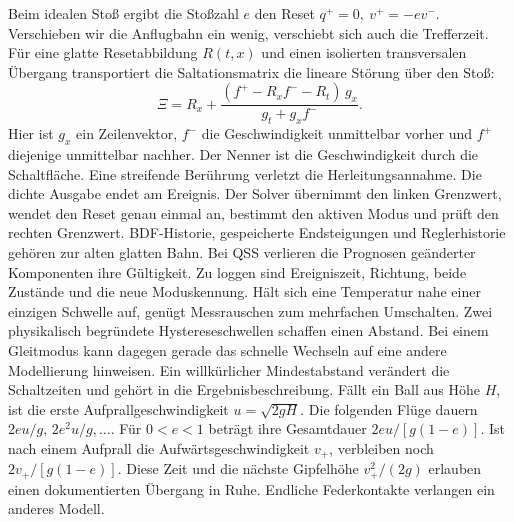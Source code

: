 \hypertarget{punkt5-3-1}{}
Beim idealen Stoß ergibt die Stoßzahl \(e\) den Reset \(q^+=0,\ v^+=-e v^-\). Verschieben wir die Anflugbahn ein wenig, verschiebt sich auch die Trefferzeit. Für eine glatte Resetabbildung \(R(t,x)\) und einen isolierten transversalen Übergang transportiert die Saltationsmatrix die lineare Störung über den Stoß:
\[
 \Xi=R_x+\frac{(f^+-R_x f^- -R_t)\,g_x}{g_t+g_x f^-}.
\]
Hier ist \(g_x\) ein Zeilenvektor, \(f^-\) die Geschwindigkeit unmittelbar vorher und \(f^+\) diejenige unmittelbar nachher. Der Nenner ist die Geschwindigkeit durch die Schaltfläche. Eine streifende Berührung verletzt die Herleitungsannahme.
\hypertarget{punkt5-3-2}{}
Die dichte Ausgabe endet am Ereignis. Der Solver übernimmt den linken Grenzwert, wendet den Reset genau einmal an, bestimmt den aktiven Modus und prüft den rechten Grenzwert. BDF-Historie, gespeicherte Endsteigungen und Reglerhistorie gehören zur alten glatten Bahn. Bei QSS verlieren die Prognosen geänderter Komponenten ihre Gültigkeit. Zu loggen sind Ereigniszeit, Richtung, beide Zustände und die neue Moduskennung.
\hypertarget{punkt5-4-1}{}
Hält sich eine Temperatur nahe einer einzigen Schwelle auf, genügt Messrauschen zum mehrfachen Umschalten. Zwei physikalisch begründete Hystereseschwellen schaffen einen Abstand. Bei einem Gleitmodus kann dagegen gerade das schnelle Wechseln auf eine andere Modellierung hinweisen. Ein willkürlicher Mindestabstand verändert die Schaltzeiten und gehört in die Ergebnisbeschreibung.
\hypertarget{punkt5-4-2}{}
Fällt ein Ball aus Höhe \(H\), ist die erste Aufprallgeschwindigkeit \(u=\sqrt{2gH}\). Die folgenden Flüge dauern \(2eu/g,\,2e^2u/g,\ldots\). Für \(0<e<1\) beträgt ihre Gesamtdauer \(2eu/[g(1-e)]\). Ist nach einem Aufprall die Aufwärtsgeschwindigkeit \(v_+\), verbleiben noch \(2v_+/[g(1-e)]\). Diese Zeit und die nächste Gipfelhöhe \(v_+^2/(2g)\) erlauben einen dokumentierten Übergang in Ruhe. Endliche Federkontakte verlangen ein anderes Modell.


